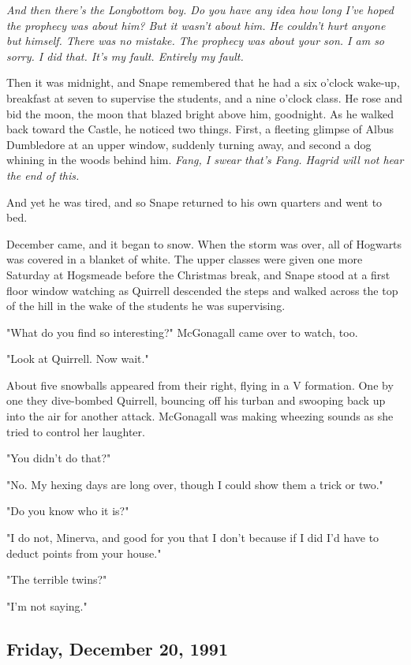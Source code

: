 \emph{And then there's the Longbottom boy. Do you have any idea how long I've hoped the prophecy was about him? But it wasn't about him. He couldn't hurt anyone but himself. There was no mistake. The prophecy was about your son. I am so sorry. I did that. It's my fault. Entirely my fault.}

Then it was midnight, and Snape remembered that he had a six o'clock wake-up, breakfast at seven to supervise the students, and a nine o'clock class. He rose and bid the moon, the moon that blazed bright above him, goodnight. As he walked back toward the Castle, he noticed two things. First, a fleeting glimpse of Albus Dumbledore at an upper window, suddenly turning away, and second a dog whining in the woods behind him. \emph{Fang, I swear that's Fang. Hagrid will not hear the end of this.}

And yet he was tired, and so Snape returned to his own quarters and went to bed.

December came, and it began to snow. When the storm was over, all of Hogwarts was covered in a blanket of white. The upper classes were given one more Saturday at Hogsmeade before the Christmas break, and Snape stood at a first floor window watching as Quirrell descended the steps and walked across the top of the hill in the wake of the students he was supervising.

"What do you find so interesting?" McGonagall came over to watch, too.

"Look at Quirrell. Now wait."

About five snowballs appeared from their right, flying in a V formation. One by one they dive-bombed Quirrell, bouncing off his turban and swooping back up into the air for another attack. McGonagall was making wheezing sounds as she tried to control her laughter.

"You didn't do that?"

"No. My hexing days are long over, though I could show them a trick or two."

"Do you know who it is?"

"I do not, Minerva, and good for you that I don't because if I did I'd have to deduct points from your house."

"The terrible twins?"

"I'm not saying."

\subsection{Friday, December 20, 1991}

